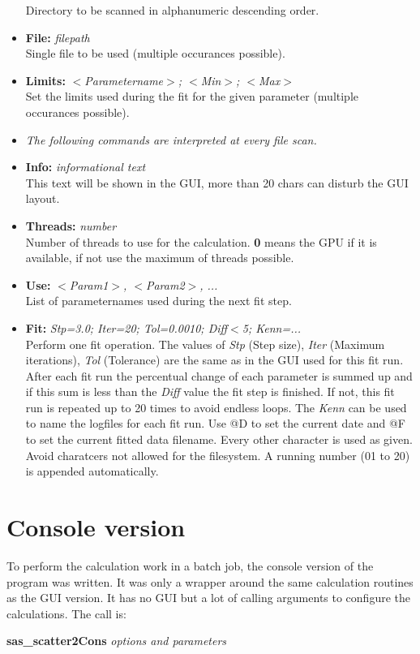 \documentclass[11pt]{article} %
\begin{document}
\begin{itemize}
	Directory to be scanned in alphanumeric descending order.
\item {\bf File:} {\it filepath} \\
	Single file to be used (multiple occurances possible).
\item {\bf Limits:} {\it $<$Parametername$>$; $<$Min$>$; $<$Max$>$} \\
	Set the limits used during the fit for the given parameter (multiple occurances possible).
\item[] {\it The following commands are interpreted at every file scan.}
\item {\bf Info:} {\it informational text} \\
	This text will be shown in the GUI, more than 20 chars can disturb the GUI layout.
\item {\bf Threads:} {\it number} \\
	Number of threads to use for the calculation. {\bf 0} means the GPU if it is available, if not use the maximum of threads possible.
\item {\bf Use:} {\it $<$Param1$>$, $<$Param2$>$, ... } \\
	List of parameternames used during the next fit step.
\item {\bf Fit:} {\it Stp=3.0; Iter=20; Tol=0.0010; Diff$<$5; Kenn=...} \\
	Perform one fit operation. The values of {\it Stp} (Step size), {\it Iter} (Maximum iterations), {\it Tol} (Tolerance) are the same as in the GUI used for this fit run. After each fit run the percentual change of each parameter is summed up and if this sum is less than the {\it Diff} value the fit step is finished. If not, this fit run is repeated up to 20 times to avoid endless loops. The {\it Kenn} can be used to name the logfiles for each fit run. Use @D to set the current date and @F to set the current fitted data filename. Every other character is used as given. Avoid charatcers not allowed for the filesystem. A running number (01 to 20) is appended automatically.
\end{itemize}



\clearpage
\section{Console version}

To perform the calculation work in a batch job, the console version of the program was written. It was only a wrapper around the same calculation routines as the GUI version. It has no GUI but a lot of calling arguments to configure the calculations. The call is: \\
\centerline{{\bf sas\_scatter2Cons} {\it options and parameters}}
\end{document}
